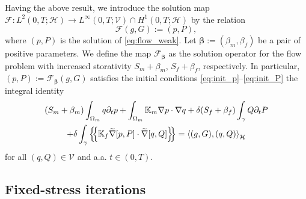 \documentclass[a4paper]{article}
\def\agrad{\widetilde\nabla}
\def\avg#1{\left\{\mskip-5mu\left\{#1\right\}\mskip-5mu\right\}}
\def\div{\operatorname{div}}
\def\dt{\prtl_t}
\def\dual#1#2{\left\langle #1,#2\right\rangle}
\def\Hf{\mathcal H}
\def\jmp#1{\left\llbracket #1 \right\rrbracket}
\def\pphi{{\varphi}}
\def\prtl{\partial}
\def\tn#1{{\mathbb{#1}}}    %
\def\Vf{{\mathcal V}} %
\def\vc#1{\mathbf{\boldsymbol{#1}}}     %
\newcommand{\eqs}[1]{\begin{equation*}#1\end{equation*}}
\newcommand{\ml}[1]{\begin{multline}#1\end{multline}}
\begin{document}
% 
Having the above result, we introduce the solution map $\mathcal F:L^2(0,T;\Hf)\to L^\infty(0,T;\Vf)\cap H^1(0,T;\Hf)$ by the relation
\eqs{ \mathcal F(g,G) := (p,P), }
where $(p,P)$ is the solution of \eqref{eq:flow_weak}.
Let $\vc\beta:=(\beta_m,\beta_f)$ be a pair of positive parameters.
We define the map $\mathcal F_{\vc\beta}$ as the solution operator for the flow problem with increased storativity $S_m+\beta_m$, $S_f+\beta_f$, respectively.
In particular, $(p,P):=\mathcal F_{\vc\beta}(g,G)$ satisfies the initial conditions \eqref{eq:init_p}--\eqref{eq:init_P} the integral identity
\ml{ \label{eq:flow_problem_beta} (S_m+\beta_m)\int_{\Omega_m} q\dt p + \int_{\Omega_m}\tn K_m\nabla p\cdot\nabla q + \delta (S_f+\beta_f)\int_\gamma Q\dt P\\
+ \delta\int_\gamma\avg{\tn K_f\agrad[p,P]\cdot\agrad[q,Q]}
= \dual{(g,G)}{(q,Q)}_\Hf }
for all $(q,Q)\in\Vf$ and a.a. $t\in(0,T)$.



\subsection{Fixed-stress iterations}
\end{document}
